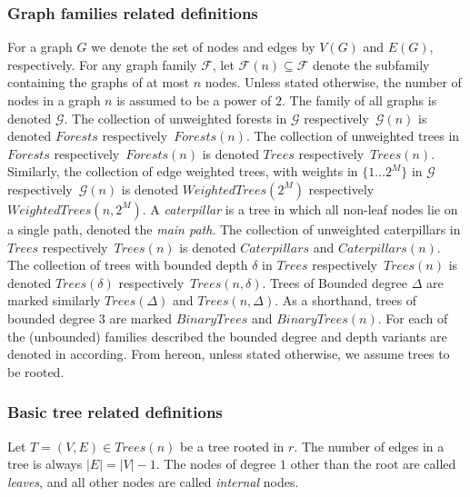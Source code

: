 			\subsubsection{Graph families related definitions} 
			For a graph $G$ we denote the set of nodes and edges by $V(G)$ and $E(G)$, respectively.
			For any graph family $\mathcal{F}$, let $\mathcal{F}(n) \subseteq \mathcal{F}$ denote the subfamily containing the graphs of at most $n$ nodes.
			Unless stated otherwise, the number of nodes in a graph $n$ is assumed to be a power of $2$.
			The family of all graphs is denoted $\mathcal{G}$.
			 The collection of unweighted forests in $\mathcal{G}$ respectively~$\mathcal{G}(n)$  is  denoted $Forests$ respectively~$Forests(n)$.
			The collection of unweighted trees in $Forests$ respectively~$Forests(n)$  is  denoted $Trees$ respectively~$Trees(n)$.
			Similarly,  the  collection of edge weighted trees, with weights in $\{1 \dots 2^M \}$  in $\mathcal{G}$ respectively~$\mathcal{G}(n)$ is denoted $WeightedTrees(2^M)$ respectively~$WeightedTrees(n,2^M)$.
			A \emph{caterpillar} is a tree in which all non-leaf nodes lie on a single path, denoted the \emph{main path}. The collection of unweighted caterpillars in $Trees$ respectively~$Trees(n)$  is denoted $Caterpillars$ and $Caterpillars(n)$.
			The collection of trees with bounded depth $\delta$ in $Trees$ respectively~$Trees(n)$  is  denoted $Trees(\delta)$ respectively~$Trees(n,\delta)$.
			Trees of  Bounded degree $\Delta$  are marked similarly $Trees(\Delta)$  and $Trees(n,\Delta)$.
			As a shorthand, trees of bounded degree $3$ are marked $BinaryTrees$ and $BinaryTrees(n)$.
			For each of the (unbounded) families described the bounded degree and depth variants are denoted in according.
			From hereon, unless stated otherwise, we assume trees to be rooted. 

	\subsubsection{Basic tree related definitions} \label{definitions-of-trees}
	Let $T=(V,E) \in Trees(n)$ be a tree rooted in $r$. The number of edges in a tree is always $|E|=|V|-1$. The nodes of degree $1$ other than the root are called \emph{leaves}, and all other nodes are called \emph{internal} nodes.
	
